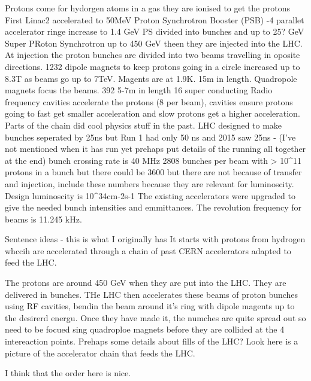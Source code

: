 Protons come for hydorgen atoms in a gas they are ionised to get the protons
First Linac2 accelerated to 50MeV Proton Synchrotron Booster (PSB) -4 parallet accelerator ringe increase to 1.4 GeV
PS divided into bunches and up to 25? GeV
Super PRoton Synchrotron up to 450 GeV theen they are injected into the LHC. At injection the proton bunches are divided into two beams travelling in oposite directions.
1232 dipole magnets to keep protons going in a circle increased up to 8.3T as beams go up to 7TeV. Magents are at 1.9K. 15m in length.
Quadropole magnets focus the beams. 392 5-7m in length
16 super conducting Radio frequency cavities accelerate the protons (8 per beam), cavities ensure protons going to fast get smaller acceleration and slow protons get a higher acceleration.
Parts of the chain did cool physics stuff in the past.
LHC designed to make bunches seperated by 25ns but Run 1 had only 50 ns and 2015 saw 25ns - (I've not mentioned when it has run yet prehaps put details of the running all together at the end)
bunch crossing rate is 40 MHz
2808 bunches per beam with > 10^{11} protons in a bunch but there could be 3600 but there are not because of transfer and injection, include these numbers because they are relevant for luminoscity.
Design luminoscity is 10^34cm-2s-1
The existing accelerators were upgraded to give the needed bunch intensities and emmittances.
The revolution frequency for beams is 11.245 kHz.


Sentence ideas - this is what I originally has
It starts with protons from hydrogen whccih are accelerated through a chain of past CERN accelerators adapted to feed the LHC. 

The protons are around 450 GeV when they are put into the LHC. They are delivered in bunches. THe LHC then accelerates these beams of proton bunches using RF cavities, bendin the beam around it's ring with dipole magents up to the desirerd energu. Once they have made it, the numches are quite spread out so need to be focued sing quadroploe magnets before they are collided at the 4 intereaction points. Prehaps some details about fills of the LHC? Look here is a picture of the accelerator chain that feeds the LHC.

I think that the order here is nice.



